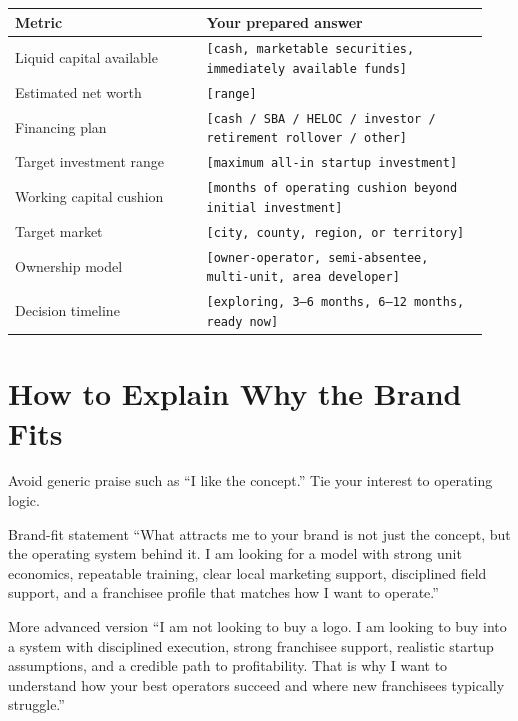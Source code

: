 \documentclass[11pt]{article}
\newcommand{\placeholder}[1]{\textcolor{accent}{\texttt{[#1]}}}
\begin{document}
\begin{longtable}{>{\raggedright\arraybackslash}p{0.38\linewidth}>{\raggedright\arraybackslash}p{0.56\linewidth}}
\toprule
\textbf{Metric} & \textbf{Your prepared answer} \\
\midrule
Liquid capital available & \placeholder{cash, marketable securities, immediately available funds} \\
Estimated net worth & \placeholder{range} \\
Financing plan & \placeholder{cash / SBA / HELOC / investor / retirement rollover / other} \\
Target investment range & \placeholder{maximum all-in startup investment} \\
Working capital cushion & \placeholder{months of operating cushion beyond initial investment} \\
Target market & \placeholder{city, county, region, or territory} \\
Ownership model & \placeholder{owner-operator, semi-absentee, multi-unit, area developer} \\
Decision timeline & \placeholder{exploring, 3--6 months, 6--12 months, ready now} \\
\bottomrule
\end{longtable}

\section{How to Explain Why the Brand Fits}

Avoid generic praise such as ``I like the concept.'' Tie your interest to operating logic.

\begin{scriptbox}{Brand-fit statement}
``What attracts me to your brand is not just the concept, but the operating system behind it. I am looking for a model with strong unit economics, repeatable training, clear local marketing support, disciplined field support, and a franchisee profile that matches how I want to operate.''
\end{scriptbox}

\begin{scriptbox}{More advanced version}
``I am not looking to buy a logo. I am looking to buy into a system with disciplined execution, strong franchisee support, realistic startup assumptions, and a credible path to profitability. That is why I want to understand how your best operators succeed and where new franchisees typically struggle.''
\end{scriptbox}
\end{document}
